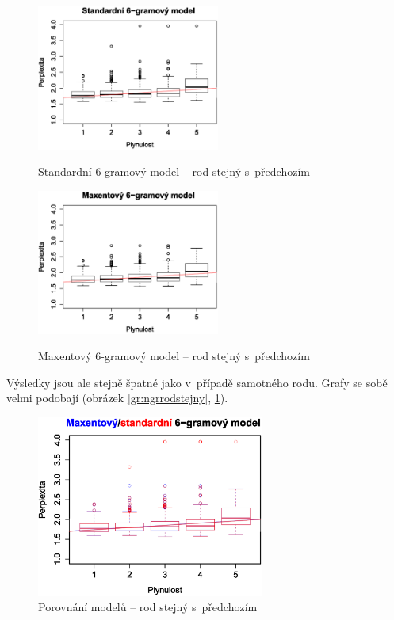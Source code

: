 \documentclass[12pt,a4paper]{report}
\begin{document}
\begin{figure}[!htb]
\begin{center}
  \centering\includegraphics[width=60mm]{./grafy/morf/ngram/rodstejny.eps}
  \caption{Standardní 6-gramový model -- rod stejný s~předchozím}\label{gr:ngrrodstejny}
\endminipage\quad
{}
  \centering\includegraphics[width=60mm]{./grafy/morf/maxent/rodstejny.eps}
  \caption{Maxentový 6-gramový model -- rod stejný s~předchozím}\label{gr:maxrodstejny}
\endminipage
\end{center}
\end{figure}

Výsledky jsou ale stejně špatné jako v~případě samotného rodu. Grafy se sobě velmi podobají (obrázek \ref{gr:ngrrodstejny}, \ref{gr:maxrodstejny}).

\begin{figure}[!htbp]
\begin{center}
	\centering
	\includegraphics[width=75mm]{./grafy/morf/porovnani/rodstejny.eps}	
	\caption{Porovnání modelů -- rod stejný s~předchozím}\label{gr:porrodstejny}
\endminipage
\end{center}
\end{figure}
\end{document}
